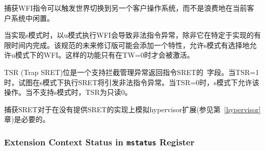 \iffalse
\begin{commentary}
Trapping the WFI
instruction can trigger a world switch to another guest OS, rather than
wastefully idling in the current guest.
\end{commentary}
\fi

\begin{commentary}
捕获WFI指令可以触发世界切换到另一个客户操作系统，而不是浪费地在当前客户系统中闲置。
\end{commentary}

\iffalse
When S-mode is implemented, then executing WFI in U-mode causes an illegal
instruction exception, unless it completes within an implementation-specific,
bounded time limit.  A future revision of this specification might add
a feature that allows S-mode to selectively permit WFI in U-mode.  Such
a feature would only be active when TW=0.

The TSR (Trap SRET) bit is a \warl\ field that
supports intercepting the supervisor exception return
instruction, SRET.  When TSR=1, attempts to execute SRET while executing in
S-mode will raise an illegal instruction exception.  When TSR=0, this
operation is permitted in S-mode.  TSR is read-only 0 when S-mode is not
supported.
\fi

当实现s模式时，以u模式执行WFI会导致非法指令异常，除非它在特定于实现的有限时间内完成。该规范的未来修订版可能会添加一个特性，允许s模式有选择地允许u模式下的WFI。这样的功能只有在TW=0时才会被激活。

TSR (Trap SRET)位是一个支持拦截管理异常返回指令SRET的\warl\ 字段。当TSR=1时，试图在s模式下执行SRET将引发非法指令异常。当TSR=0时，s模式下允许该操作。当不支持s模式时，TSR为只读0。
\iffalse
\begin{commentary}
Trapping SRET is necessary to emulate the hypervisor extension
(see Chapter~\ref{hypervisor}) on implementations that do not provide it.
\end{commentary}
\fi

\begin{commentary}
捕获SRET对于在没有提供SRET的实现上模拟hypervisor扩展(参见第~\ref{hypervisor}章)是必要的。
\end{commentary}


\subsubsection{Extension Context Status in {\tt mstatus} Register}

\iffalse
Supporting substantial extensions is one of the primary goals of
RISC-V, and hence we define a standard interface to allow unchanged
privileged-mode code, particularly a supervisor-level OS, to support
arbitrary user-mode state extensions.
\fi

